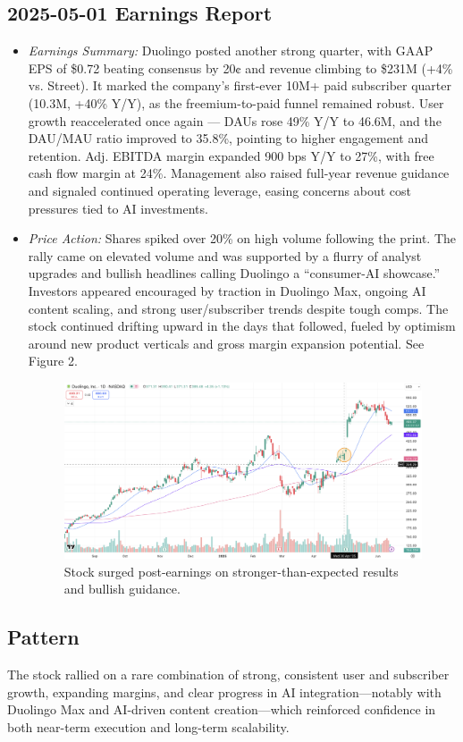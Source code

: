 \documentclass[11pt]{article}
\begin{document}
    \subsection{2025-05-01 Earnings Report}
        \begin{itemize}
            \item \textit{Earnings Summary:} Duolingo posted another strong quarter, with GAAP EPS of \$0.72 beating consensus by 20¢ and revenue climbing to \$231M (+4\% vs. Street). It marked the company’s first-ever 10M+ paid subscriber quarter (10.3M, +40\% Y/Y), as the freemium-to-paid funnel remained robust. User growth reaccelerated once again — DAUs rose 49\% Y/Y to 46.6M, and the DAU/MAU ratio improved to 35.8\%, pointing to higher engagement and retention. Adj. EBITDA margin expanded 900 bps Y/Y to 27\%, with free cash flow margin at 24\%. Management also raised full-year revenue guidance and signaled continued operating leverage, easing concerns about cost pressures tied to AI investments.
            \item \textit{Price Action:} Shares spiked over 20\% on high volume following the print. The rally came on elevated volume and was supported by a flurry of analyst upgrades and bullish headlines calling Duolingo a “consumer-AI showcase.” Investors appeared encouraged by traction in Duolingo Max, ongoing AI content scaling, and strong user/subscriber trends despite tough comps. The stock continued drifting upward in the days that followed, fueled by optimism around new product verticals and gross margin expansion potential. See Figure 2.
            \begin{figure}[h]
                \centering \includegraphics[width=0.8\linewidth]{images/DUOL2.png}
                \caption{Stock surged post-earnings on stronger-than-expected results and bullish guidance.}
            \end{figure}
        \end{itemize}
    \subsection{Pattern}
        The stock rallied on a rare combination of strong, consistent user and subscriber growth, expanding margins, and clear progress in AI integration—notably with Duolingo Max and AI-driven content creation—which reinforced confidence in both near-term execution and long-term scalability.  
\end{document}
